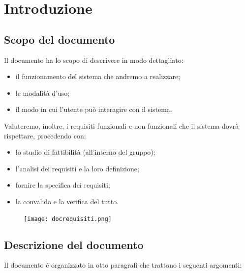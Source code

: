 \documentclass{article}
\begin{document}
\tableofcontents

\pagebreak
  
\section{Introduzione}

\subsection{Scopo del documento}

Il documento ha lo scopo di descrivere in modo dettagliato:
\begin{itemize}
\item il funzionamento del sistema che andremo a realizzare;
\item le modalità d’uso;
\item il modo in cui l’utente può interagire con il sistema.
\end{itemize}

Valuteremo, inoltre, i requisiti funzionali e non funzionali che il sistema dovrà rispettare, procedendo con:
\begin{itemize}
\item lo studio di fattibilità (all'interno del gruppo);
\item l’analisi dei requisiti e la loro definizione;
\item fornire la specifica dei requisiti;
\item la convalida e la verifica del tutto.
\end{itemize}

\vspace{10pt}
\begin{figure}[htbp]
\centering
\texttt{[image: docrequisiti.png]}
\end{figure}

\subsection{Descrizione del documento}

Il documento è organizzato in otto paragrafi che trattano i seguenti argomenti:
\end{document}
